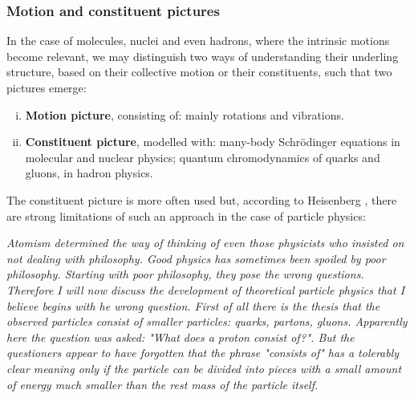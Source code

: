 \documentclass[12pt,a4paper]{report}
\theoremstyle{definition}
\theoremstyle{remark}
\theoremstyle{remark}
\begin{document}
\subsubsection{Motion and constituent pictures}
In the case of molecules, nuclei and even hadrons, where the intrinsic motions become relevant, we may distinguish two ways of understanding their underling structure, based on their collective motion or their constituents, such that two pictures emerge:
\begin{enumerate}[i.]
\item \textbf{Motion picture}, consisting of: mainly rotations and vibrations.
\item \textbf{Constituent picture}, modelled with: many-body Schrödinger equations in molecular and nuclear physics; quantum chromodynamics of quarks and gluons, in hadron physics.
\end{enumerate}
The constituent picture is more often used but, according to Heisenberg \cite{bloch}, there are strong limitations of such an approach in the case of particle physics:
\begin{displayquote}
\textit{Atomism determined the way of thinking of even those physicists who insisted on not dealing with philosophy. Good physics has sometimes been spoiled by poor philosophy. Starting with poor philosophy, they pose the wrong questions.\\
Therefore I will now discuss the development of theoretical particle physics that I believe begins with he wrong question. First of all there is the thesis that the observed particles consist of smaller particles: quarks, partons, gluons. Apparently here the question was asked: "What does a proton consist of?". But the questioners appear to have forgotten that the phrase "consists of" has a tolerably clear meaning only if the particle can be divided into pieces with a small amount of energy much smaller than the rest mass of the particle itself.}
\end{displayquote}
\end{document}
